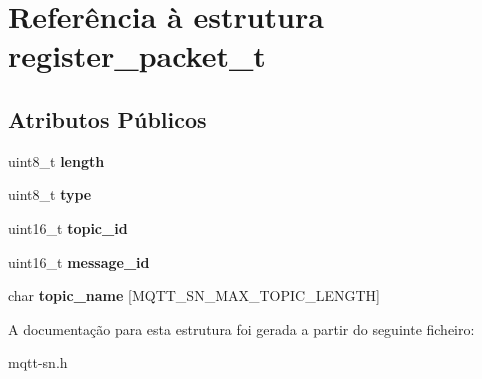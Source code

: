 \hypertarget{structregister__packet__t}{\section{Referência à estrutura register\+\_\+packet\+\_\+t}
\label{structregister__packet__t}
}
\subsection*{Atributos Públicos}
\begin{DoxyCompactItemize}
\item 
\hypertarget{structregister__packet__t_a24462876cab1ee115eab12d1f96f605f}{uint8\+\_\+t {\bfseries length}}\label{structregister__packet__t_a24462876cab1ee115eab12d1f96f605f}

\item 
\hypertarget{structregister__packet__t_a89183a1557a1c6422b0e6b9edf022941}{uint8\+\_\+t {\bfseries type}}\label{structregister__packet__t_a89183a1557a1c6422b0e6b9edf022941}

\item 
\hypertarget{structregister__packet__t_a2dd9b7da1b08d944eff685021eaefd26}{uint16\+\_\+t {\bfseries topic\+\_\+id}}\label{structregister__packet__t_a2dd9b7da1b08d944eff685021eaefd26}

\item 
\hypertarget{structregister__packet__t_af84a2324fa1e64ee1eafbd43e3580f4b}{uint16\+\_\+t {\bfseries message\+\_\+id}}\label{structregister__packet__t_af84a2324fa1e64ee1eafbd43e3580f4b}

\item 
\hypertarget{structregister__packet__t_a10223e5325f38eb2da99e06017220cb9}{char {\bfseries topic\+\_\+name} \mbox{[}M\+Q\+T\+T\+\_\+\+S\+N\+\_\+\+M\+A\+X\+\_\+\+T\+O\+P\+I\+C\+\_\+\+L\+E\+N\+G\+T\+H\mbox{]}}\label{structregister__packet__t_a10223e5325f38eb2da99e06017220cb9}

\end{DoxyCompactItemize}


A documentação para esta estrutura foi gerada a partir do seguinte ficheiro\+:\begin{DoxyCompactItemize}
\item 
mqtt-\/sn.\+h\end{DoxyCompactItemize}

